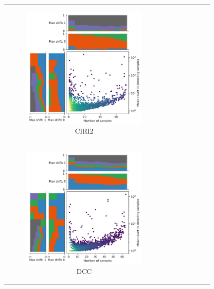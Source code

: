 \begin{figure}[ht]
\begin{tabular}{cc}
\begin{subfigure}{.4\textwidth}
                       \includegraphics[width=\linewidth]{chapters/4_results_and_discussion/figures/detection/density/ciri2.png}
                       \caption{CIRI2} \label{fig:detection_density_ciri2} \end{subfigure}
               \\ \begin{subfigure}{.4\textwidth}
            \centering 

            \includegraphics[width=\linewidth]{chapters/4_results_and_discussion/figures/detection/density/dcc.png}
            \caption{DCC} \label{fig:detection_density_dcc} \end{subfigure} &
                  \begin{subfigure}{.4\textwidth} \centering 


\end{subfigure}
\end{tabular}
\end{figure}
